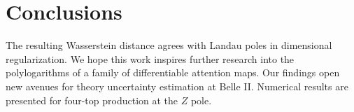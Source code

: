\section{Conclusions}\label{sec:conclusions}

The resulting Wasserstein distance agrees with Landau poles in
dimensional regularization. We hope this work inspires further research
into the polylogarithms of a family of differentiable attention maps.
Our findings open new avenues for theory uncertainty estimation at Belle
II. Numerical results are presented for four-top production at the $Z$
pole.


